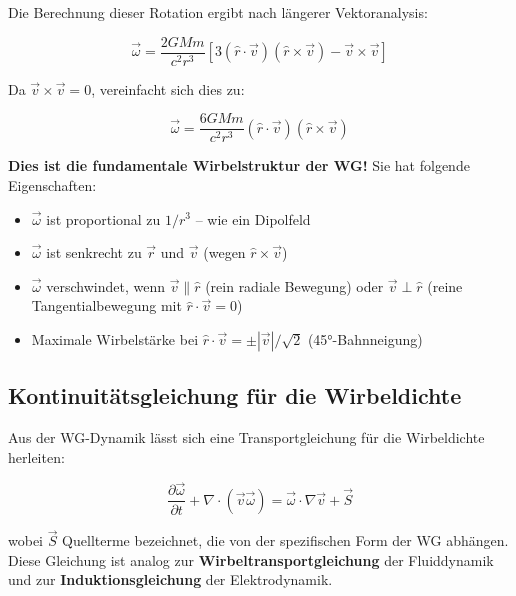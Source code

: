 \documentclass[12pt,a4paper]{article}
\begin{document}
Die Berechnung dieser Rotation ergibt nach längerer Vektoranalysis:

\begin{equation}
\vec{\omega} = \frac{2GMm}{c^2 r^3} \left[ 3(\hat{r}\cdot\vec{v})(\hat{r} \times \vec{v}) - \vec{v} \times \vec{v} \right]
\end{equation}

Da \(\vec{v} \times \vec{v} = 0\), vereinfacht sich dies zu:

\begin{equation}
\boxed{\vec{\omega} = \frac{6GMm}{c^2 r^3} (\hat{r}\cdot\vec{v})(\hat{r} \times \vec{v})}
\label{eq:vorticity_final}
\end{equation}

\textbf{Dies ist die fundamentale Wirbelstruktur der WG!} Sie hat folgende Eigenschaften:

\begin{itemize}
    \item \(\vec{\omega}\) ist proportional zu \(1/r^3\) – wie ein Dipolfeld
    \item \(\vec{\omega}\) ist senkrecht zu \(\vec{r}\) und \(\vec{v}\) (wegen \(\hat{r} \times \vec{v}\))
    \item \(\vec{\omega}\) verschwindet, wenn \(\vec{v} \parallel \hat{r}\) (rein radiale Bewegung) oder \(\vec{v} \perp \hat{r}\) (reine Tangentialbewegung mit \(\hat{r}\cdot\vec{v} = 0\))
    \item Maximale Wirbelstärke bei \(\hat{r}\cdot\vec{v} = \pm|\vec{v}|/\sqrt{2}\) (45°-Bahnneigung)
\end{itemize}

\subsection{Kontinuitätsgleichung für die Wirbeldichte}

Aus der WG-Dynamik lässt sich eine Transportgleichung für die Wirbeldichte herleiten:

\begin{equation}
\frac{\partial \vec{\omega}}{\partial t} + \nabla \cdot (\vec{v} \vec{\omega}) = \vec{\omega} \cdot \nabla \vec{v} + \vec{S}
\label{eq:vorticity_transport}
\end{equation}

wobei \(\vec{S}\) Quellterme bezeichnet, die von der spezifischen Form der WG abhängen. Diese Gleichung ist analog zur \textbf{Wirbeltransportgleichung} der Fluiddynamik und zur \textbf{Induktionsgleichung} der Elektrodynamik.
\end{document}

